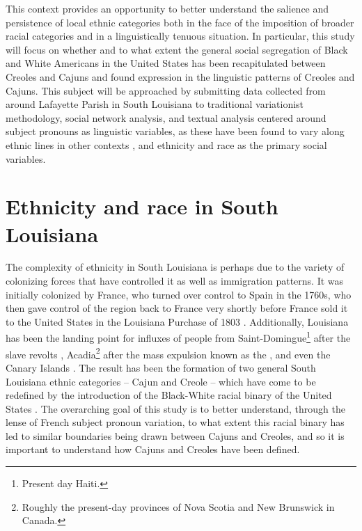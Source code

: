   This context provides an opportunity to better understand the salience and persistence of local ethnic categories both in the face of the imposition of broader racial categories and in a linguistically tenuous situation.
  In particular, this study will focus on whether and to what extent the general social segregation of Black and White Americans in the United States \parencite{smith_social_2014} has been recapitulated between Creoles and Cajuns and found expression in the linguistic patterns of Creoles and Cajuns.
  This subject will be approached by submitting data collected from around Lafayette Parish in South Louisiana to traditional variationist methodology, social network analysis, and textual analysis centered around subject pronouns as linguistic variables, as these have been found to vary along ethnic lines in other contexts \parencite{dajko_ethnic_2009, rottet_language_1995}, and ethnicity and race as the primary social variables.

  \section{Ethnicity and race in South Louisiana}
    \label{sec:ethnicity_race}
    The complexity of ethnicity in South Louisiana is perhaps due to the variety of colonizing forces that have controlled it as well as immigration patterns.
    It was initially colonized by France, who turned over control to Spain in the 1760s, who then gave control of the region back to France very shortly before France sold it to the United States in the Louisiana Purchase of 1803 \parencite{fortier_french_1884, johnson_louisiana_1976, klingler_if_2003}.
    Additionally, Louisiana has been the landing point for influxes of people from Saint-Domingue\footnote{
      Present day Haiti.
    } after the slave revolts \parencite[Debien \& Le Gardeur, 1981, as cited in][]{klingler_if_2003}, Acadia\footnote{
      Roughly the present-day provinces of Nova Scotia and New Brunswick in Canada.
    } after the mass expulsion known as the  \parencite{fortier_french_1884, klingler_if_2003, neumann_creole_1985}, and even the Canary Islands \parencite{klingler_if_2003}.
    The result has been the formation of two general South Louisiana ethnic categories -- Cajun and Creole -- which have come to be redefined by the introduction of the Black-White racial binary of the United States \parencite{dajko_sociolinguistics_2012}.
    The overarching goal of this study is to better understand, through the lense of French subject pronoun variation, to what extent this racial binary has led to similar boundaries being drawn between Cajuns and Creoles, and so it is important to understand how Cajuns and Creoles have been defined.

